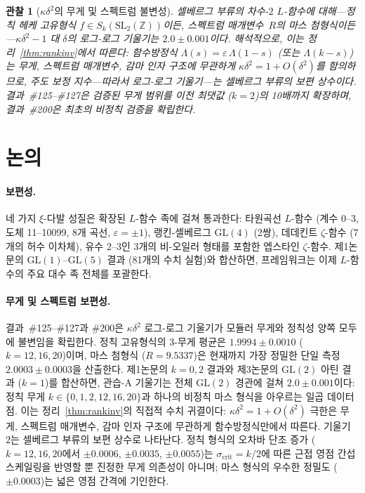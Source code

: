 \documentclass[11pt, a4paper]{article}
\theoremstyle{plain}
\newtheorem{observation}[theorem]{관찰}
\theoremstyle{definition}
\begin{document}
\begin{observation}[$\kappa\delta^{2}$의 무게 및 스펙트럼 불변성]
\label{obs:weightinv}
  셀베르그 부류의 차수-$2$ $L$-함수에 대해---정칙 헤케 고유형식
  $f\in S_k(\mathrm{SL}_2(\mathbb{Z}))$이든, 스펙트럼 매개변수~$R$의
  마스 첨형식이든---$\kappa\delta^{2}-1$ 대 $\delta$의
  로그-로그 기울기는 $2.0\pm 0.001$이다.
  해석적으로, 이는 정리~\ref{thm:rankinv}에서 따른다:
  함수방정식 $\Lambda(s)=\varepsilon\,\Lambda(1{-}s)$
  (또는 $\Lambda(k{-}s)$)는 무게, 스펙트럼 매개변수, 감마 인자 구조에
  무관하게 $\kappa\delta^{2}=1+O(\delta^{2})$를 함의하므로,
  주도 보정 지수---따라서 로그-로그 기울기---는 셀베르그 부류의
  \emph{보편 상수}이다.
  결과~\#125--\#127은 검증된 무게 범위를 이전 최댓값 ($k=2$)의
  10배까지 확장하며, 결과~\#200은 최초의 비정칙 검증을 확립한다.
\end{observation}


\section{논의}
\label{sec:disc}

\paragraph{보편성.}
네 가지 $\xi$-다발 성질은 확장된 $L$-함수 족에 걸쳐 통과한다:
타원곡선 $L$-함수 (계수 0--3, 도체 11--10099, 8개 곡선, $\varepsilon=\pm 1$),
랭킨-셀베르그 $\mathrm{GL}(4)$ (2쌍),
데데킨트 $\zeta$-함수 (7개의 허수 이차체),
유수 2--3인 3개의 비-오일러 형태를 포함한 엡스타인 $\zeta$-함수.
제1논문의 $\mathrm{GL}(1)$--$\mathrm{GL}(5)$ 결과 (81개의 수치 실험)와 합산하면,
프레임워크는 이제 $L$-함수의 주요 대수 족 전체를 포괄한다.

\paragraph{무게 및 스펙트럼 보편성.}
결과~\#125--\#127과 \#200은 $\kappa\delta^{2}$ 로그-로그 기울기가
모듈러 무게와 정칙성 양쪽 모두에 불변임을 확립한다.
정칙 고유형식의 3-무게 평균은 $1.9994\pm 0.0010$ ($k=12,16,20$)이며,
마스 첨형식 ($R=9.5337$)은 현재까지 가장 정밀한 단일 측정
$2.0003\pm 0.0003$을 산출한다.
제1논문의 $k=0,2$ 결과와 제3논문의 $\mathrm{GL}(2)$ 아틴 결과
($k=1$)를 합산하면, 관습-A 기울기는 전체 $\mathrm{GL}(2)$ 경관에 걸쳐
$2.0\pm 0.001$이다: 정칙 무게 $k\in\{0,1,2,12,16,20\}$과
하나의 비정칙 마스 형식을 아우르는 일곱 데이터 점.
이는 정리~\ref{thm:rankinv}의 직접적 수치 귀결이다:
$\kappa\delta^{2}=1+O(\delta^{2})$ 극한은 무게, 스펙트럼 매개변수,
감마 인자 구조에 무관하게 함수방정식만에서 따른다.
기울기~$2$는 셀베르그 부류의 보편 상수로 나타난다.
정칙 형식의 오차바 단조 증가 ($k=12,16,20$에서
$\pm0.0006$, $\pm0.0035$, $\pm0.0055$)는
$\sigma_{\mathrm{crit}}=k/2$에 따른 근접 영점 간섭 스케일링을 반영할 뿐
진정한 무게 의존성이 아니며; 마스 형식의 우수한 정밀도 ($\pm 0.0003$)는
넓은 영점 간격에 기인한다.
\end{document}

